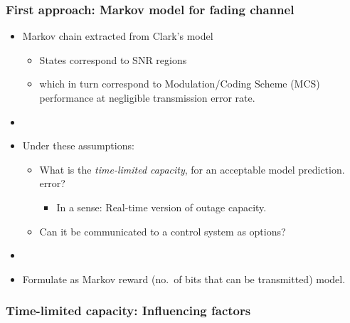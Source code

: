 \documentclass{beamer}
\begin{document}
\begin{frame}
  \frametitle{First approach: Markov model for fading channel}

  \begin{itemize}
  \item Markov chain extracted from  Clark's model 
    \begin{itemize}
    \item States correspond to SNR regions
    \item which in turn correspond to
      Modulation/Coding Scheme (MCS) performance at negligible transmission error rate.
    \end{itemize}
    \item[]
  \item Under these assumptions: 
    \begin{itemize}
    \item What is the \emph{time-limited capacity}, for an acceptable model prediction.
      error?
      \begin{itemize}
      \item In a sense: Real-time version of outage capacity. 
      \end{itemize}
    \item Can it be communicated to a control system as options? 
    \end{itemize}
    \item[]
  \item Formulate as Markov reward (no.\ of bits that can be transmitted) model.
  \end{itemize}
\end{frame}

\begin{frame}
  \frametitle{Time-limited capacity: Influencing factors}
  \begin{center}
  \end{center}
\end{frame}
\end{document}
